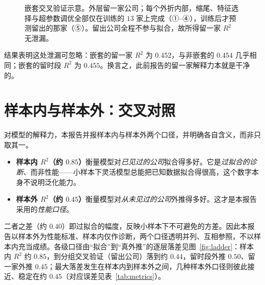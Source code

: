 \documentclass[UTF8, a4paper, fontset=none, zihao=-4]{ctexrep}
\begin{document}
\begin{figure}[htbp]
\centering
{}
\caption{嵌套交叉验证示意。外层留一家公司；每个外折内部，缩尾、特征选择与超参数调优全部仅在训练的 $13$ 家上完成（①--④），训练后才预测留出的那家（⑤）。留出公司全程不参与拟合，故所得留一家 $R^2$ 无泄漏。}
\label{fig:nested}
\end{figure}

结果表明这处泄漏可忽略：嵌套的留一家 $R^2$ 为 $0.452$，与非嵌套的 $0.454$ 几乎相同；嵌套的留时段 $R^2$ 为 $0.455$。换言之，此前报告的留一家解释力本就是干净的。

\section{样本内与样本外：交叉对照}
对模型的解释力，本报告并报样本内与样本外两个口径，并明确各自含义，而非只取其一。
\begin{itemize}
  \item \textbf{样本内 $R^2$（约 $0.85$）}衡量模型对\emph{已见过的公司}拟合得多好。它是\emph{过拟合的诊断}、而非性能——小样本下灵活模型总能把已知数据拟合得很高，这个数字本身不说明泛化能力。
  \item \textbf{样本外 $R^2$（约 $0.45$）}衡量模型对\emph{从未见过的公司}外推得多好。这才是本报告采用的\emph{性能口径}。
\end{itemize}
二者之差（约 $0.40$）即过拟合的幅度，反映小样本下不可避免的方差。因此本报告以样本外为性能标准、样本内仅作诊断，两个口径透明并列、互相参照，不以样本内充当成绩。各级口径由“拟合”到“真外推”的逐层落差见图~\ref{fig:ladder}：样本内 $R^2$ 约 $0.85$，到分组交叉验证（留出公司）落到约 $0.44$，留时段外推 $0.50$、留一家外推 $0.45$；最大落差发生在样本内到样本外之间，几种样本外口径则彼此接近、稳定在约 $0.45$（对应误差见表~\ref{tab:metrics}）。
\end{document}
